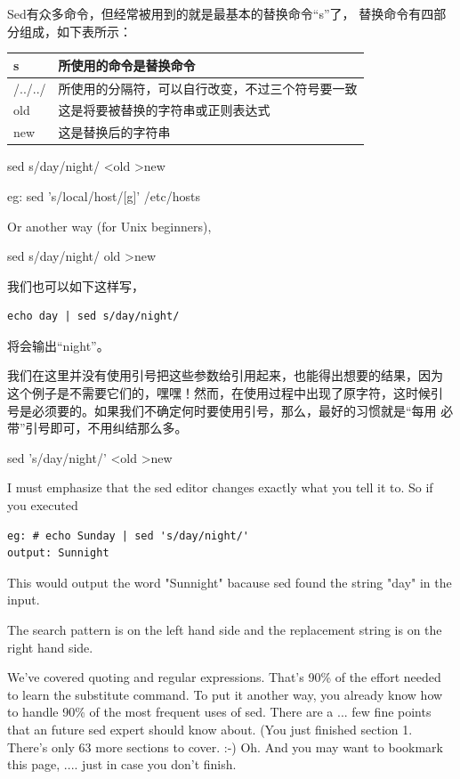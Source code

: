 Sed有众多命令，但经常被用到的就是最基本的替换命令“s”了， 替换命令有四部
分组成，如下表所示：

\begin{table}[h]
\centering
\begin{tabular}{l|l}
\hline
s	     & 所使用的命令是替换命令 \\
\hline
/../../	 & 所使用的分隔符，可以自行改变，不过三个符号要一致 \\
\hline
old	     & 这是将要被替换的字符串或正则表达式 \\
\hline
new	     & 这是替换后的字符串 \\
\hline
\end{tabular}
\end{table}

sed s/day/night/ <old >new

eg: sed 's/local/host/[g]' /etc/hosts
 
Or another way (for Unix beginners), 

sed s/day/night/ old >new
 
我们也可以如下这样写，

\small{
\begin{verbatim}
echo day | sed s/day/night/ 
\end{verbatim}
}
\normalsize

将会输出“night”。

我们在这里并没有使用引号把这些参数给引用起来，也能得出想要的结果，因为
这个例子是不需要它们的，嘿嘿！然而，在使用过程中出现了原字符，这时候引
号是必须要的。如果我们不确定何时要使用引号，那么，最好的习惯就是“每用
必带”引号即可，不用纠结那么多。

sed 's/day/night/' <old >new

I must emphasize that the sed editor changes exactly what you tell it
to. So if you executed
 
\begin{verbatim}
eg: # echo Sunday | sed 's/day/night/'
output: Sunnight
\end{verbatim}
 
This would output the word "Sunnight" bacause sed found the string
"day" in the input.
 
The search pattern is on the left hand side and the replacement string
is on the right hand side.
 
We've covered quoting and regular expressions. That's 90\% of the
effort needed to learn the substitute command. To put it another way,
you already know how to handle 90\% of the most frequent uses of
sed. There are a ... few fine points that an future sed expert should
know about. (You just finished section 1. There's only 63 more
sections to cover. :-) Oh. And you may want to bookmark this page,
.... just in case you don't finish.

